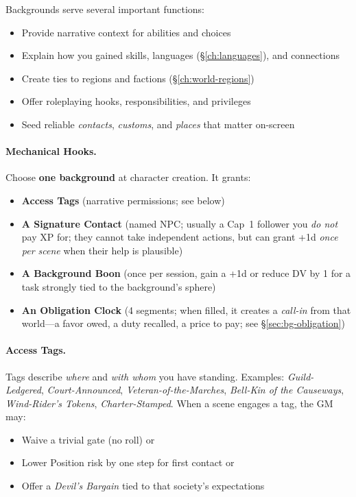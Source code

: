 Backgrounds serve several important functions:
\begin{itemize}
\item Provide narrative context for abilities and choices
\item Explain how you gained skills, languages (\S\ref{ch:languages}), and connections
\item Create ties to regions and factions (\S\ref{ch:world-regions})
\item Offer roleplaying hooks, responsibilities, and privileges
\item Seed reliable \emph{contacts}, \emph{customs}, and \emph{places} that matter on-screen
\end{itemize}

\paragraph{Mechanical Hooks.}
Choose \textbf{one background} at character creation. It grants:
\begin{itemize}
\item \textbf{Access Tags} (narrative permissions; see below)
\item \textbf{A Signature Contact} (named NPC; usually a Cap~1 follower you \emph{do not} pay XP for; they cannot take independent actions, but can grant +1d \emph{once per scene} when their help is plausible)
\item \textbf{A Background Boon} (once per session, gain a +1d or reduce DV by 1 for a task strongly tied to the background's sphere)
\item \textbf{An Obligation Clock} (4 segments; when filled, it creates a \emph{call-in} from that world—a favor owed, a duty recalled, a price to pay; see \S\ref{sec:bg-obligation})
\end{itemize}

\paragraph{Access Tags.}
Tags describe \emph{where} and \emph{with whom} you have standing. Examples: \textit{Guild-Ledgered}, \textit{Court-Announced}, \textit{Veteran-of-the-Marches}, \textit{Bell-Kin of the Causeways}, \textit{Wind-Rider's Tokens}, \textit{Charter-Stamped}. When a scene engages a tag, the GM may:
\begin{itemize}
\item Waive a trivial gate (no roll) or
\item Lower Position risk by one step for first contact or
\item Offer a \emph{Devil's Bargain} tied to that society's expectations
\end{itemize}

